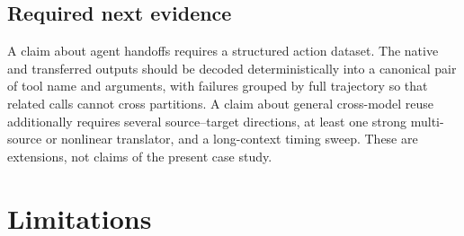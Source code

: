 \documentclass[10pt,twocolumn]{article}
\begin{document}
\subsection{Required next evidence}

A claim about agent handoffs requires a structured action dataset.  The native
and transferred outputs should be decoded deterministically into a canonical
pair of tool name and arguments, with failures grouped by full trajectory so
that related calls cannot cross partitions.  A claim about general cross-model
reuse additionally requires several source--target directions, at least one
strong multi-source or nonlinear translator, and a long-context timing sweep.
These are extensions, not claims of the present case study.

\section{Limitations}
\end{document}
